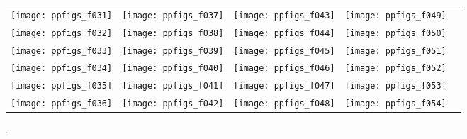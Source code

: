 \documentclass[sigconf]{acmart}
\begin{document}
{%



\begin{figure*}
\centering
\begin{tabular}{@{}c@{}c@{}c@{}c@{}c@{}}
\texttt{[image: ppfigs\_f031]}&
\texttt{[image: ppfigs\_f037]}&
\texttt{[image: ppfigs\_f043]}&
\texttt{[image: ppfigs\_f049]}\\[-0.25em]
\texttt{[image: ppfigs\_f032]}&
\texttt{[image: ppfigs\_f038]}&
\texttt{[image: ppfigs\_f044]}&
\texttt{[image: ppfigs\_f050]}\\[-0.25em]
\texttt{[image: ppfigs\_f033]}&
\texttt{[image: ppfigs\_f039]}&
\texttt{[image: ppfigs\_f045]}&
\texttt{[image: ppfigs\_f051]}\\[-0.25em]
\texttt{[image: ppfigs\_f034]}&
\texttt{[image: ppfigs\_f040]}&
\texttt{[image: ppfigs\_f046]}&
\texttt{[image: ppfigs\_f052]}\\[-0.25em]
\texttt{[image: ppfigs\_f035]}&
\texttt{[image: ppfigs\_f041]}&
\texttt{[image: ppfigs\_f047]}&
\texttt{[image: ppfigs\_f053]}\\[-0.25em]
\texttt{[image: ppfigs\_f036]}&
\texttt{[image: ppfigs\_f042]}&
\texttt{[image: ppfigs\_f048]}&
\texttt{[image: ppfigs\_f054]}
\end{tabular}
\vspace*{-0.2cm}
\caption[Expected running time (\ERT) divided by dimension
versus dimension in log-log presentation]{
\label{fig:scaling2}
. 
}
% 
\end{figure*}



 
}
\end{document}
